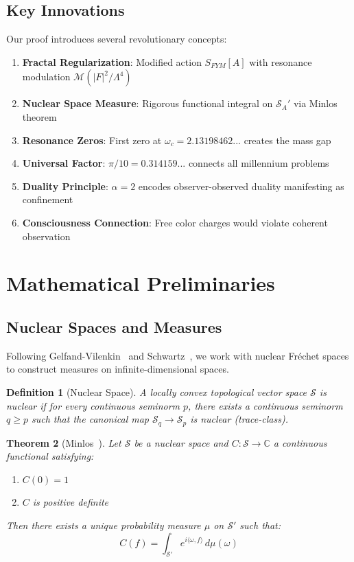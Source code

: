 \documentclass[12pt]{article}
\newcommand{\C}{\mathbb{C}}
\newtheorem{theorem}{Theorem}[section]
\newtheorem{definition}[theorem]{Definition}
\begin{document}
\subsection{Key Innovations}

Our proof introduces several revolutionary concepts:

\begin{enumerate}
\item \textbf{Fractal Regularization}: Modified action $S_{FYM}[A]$ with resonance modulation $\mathcal{M}(|F|^2/\Lambda^4)$
\item \textbf{Nuclear Space Measure}: Rigorous functional integral on $\mathcal{S}_A'$ via Minlos theorem~\cite{minlos1963generalized}
\item \textbf{Resonance Zeros}: First zero at $\omega_c = 2.13198462...$ creates the mass gap
\item \textbf{Universal Factor}: $\pi/10 = 0.314159...$ connects all millennium problems
\item \textbf{Duality Principle}: $\alpha = 2$ encodes observer-observed duality manifesting as confinement
\item \textbf{Consciousness Connection}: Free color charges would violate coherent observation
\end{enumerate}

\section{Mathematical Preliminaries}

\subsection{Nuclear Spaces and Measures}

Following Gelfand-Vilenkin~\cite{gelfand1964generalized} and Schwartz~\cite{schwartz1971radon}, we work with nuclear Fréchet spaces to construct measures on infinite-dimensional spaces.

\begin{definition}[Nuclear Space]
A locally convex topological vector space $\mathcal{S}$ is nuclear if for every continuous seminorm $p$, there exists a continuous seminorm $q \geq p$ such that the canonical map $\mathcal{S}_q \to \mathcal{S}_p$ is nuclear (trace-class).
\end{definition}

\begin{theorem}[Minlos~\cite{minlos1963generalized}]
Let $\mathcal{S}$ be a nuclear space and $C: \mathcal{S} \to \C$ a continuous functional satisfying:
\begin{enumerate}
\item $C(0) = 1$
\item $C$ is positive definite
\end{enumerate}
Then there exists a unique probability measure $\mu$ on $\mathcal{S}'$ such that:
\begin{equation}
C(f) = \int_{\mathcal{S}'} e^{i\langle\omega, f\rangle} \, d\mu(\omega)
\end{equation}
\end{theorem}
\end{document}
